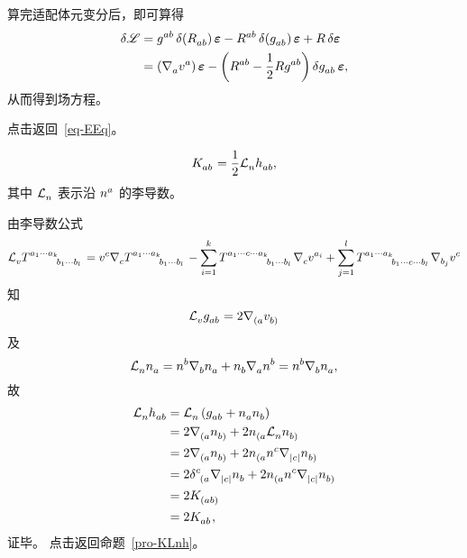 \begin{Remark}
\begin{enumerate}
				算完适配体元变分后，即可算得
				\begin{equation}
					\begin{split}
						\var{\La} &= \tensor{g}{^a^b} \var(\tensor{R}{_a_b}) \form{\vol} - \tensor{R}{^a^b} \var(\tensor{g}{_a_b}) \form{\vol} + R \var{\form{\vol}}\\
						&= \left( \Nabla{a} \tensor{v}{^a} \right) \form{\vol} - \left( \tensor{R}{^a^b} - \frac{1}{2} R \tensor{g}{^a^b} \right) \var{\tensor{g}{_a_b}} \form{\vol},
					\end{split}
				\end{equation}
				从而得到场方程。
			\end{enumerate}
			{\normalfont\ttfamily\color{green} 点击返回~\eqref{eq-EEq}。}
		\end{Remark}

		\begin{Property}
			\begin{equation}
				\tensor{K}{_a_b} = \frac{1}{2} \Ld{n} \tensor{h}{_a_b},
			\end{equation}
			其中 $\Ld{n}$ 表示沿 $\tensor{n}{^a}$ 的李导数。
		\end{Property}
		\begin{Proof}
			\label{prf-KLnh}
			由李导数公式
			\begin{equation}
				\Ld{v} \tensor{T}{^{a_1 \cdots a_k}_{b_1 \cdots b_l}} = \tensor{v}{^c} \Nabla{c} \tensor{T}{^{a_1 \cdots a_k}_{b_1 \cdots b_l}} - \sum_{i=1}^k \tensor{T}{^{a_1 \cdots c \cdots a_k}_{b_1 \cdots b_l}} \Nabla{c} \tensor{v}{^{a_i}} + \sum_{j=1}^l \tensor{T}{^{a_1 \cdots a_k}_{b_1 \cdots c \cdots b_l}} \Nabla{{b_j}} \tensor{v}{^c}
			\end{equation}
			知
			\begin{equation}
				\Ld{v} \tensor{g}{_a_b} = 2 \Nabla{{(a}} \tensor{v}{_{b)}}
			\end{equation}
			及
			\begin{equation}
				\Ld{n} \tensor{n}{_a} = \tensor{n}{^b} \Nabla{b} \tensor{n}{_a} + \tensor{n}{_b} \Nabla{a} \tensor{n}{^b} = \tensor{n}{^b} \Nabla{b} \tensor{n}{_a},
			\end{equation}
			故
			\begin{equation}
				\begin{split}
					\Ld{n} \tensor{h}{_a_b} &= \Ld{n} \left( \tensor{g}{_a_b} + \tensor{n}{_a} \tensor{n}{_b} \right)\\
					&= 2 \Nabla{{(a}} \tensor{n}{_{b)}} + 2 \tensor{n}{_{(a}} \Ld{n} \tensor{n}{_{b)}}\\
					&= 2 \Nabla{{(a}} \tensor{n}{_{b)}} + 2 \tensor{n}{_{(a}} \tensor{n}{^c} \Nabla{{|c|}} \tensor{n}{_{b)}}\\
					&= 2 \tensor{\delta}{^c_{(a}} \Nabla{{|c|}} \tensor{n}{_b} + 2 \tensor{n}{_{(a}} \tensor{n}{^c} \Nabla{{|c|}} \tensor{n}{_{b)}}\\
					&= 2 \tensor{K}{_{(ab)}}\\
					&= 2 \tensor{K}{_a_b},
				\end{split}
			\end{equation}
			证毕。{\normalfont\ttfamily\color{green} 点击返回命题~\ref{pro-KLnh}。}
		\end{Proof}

